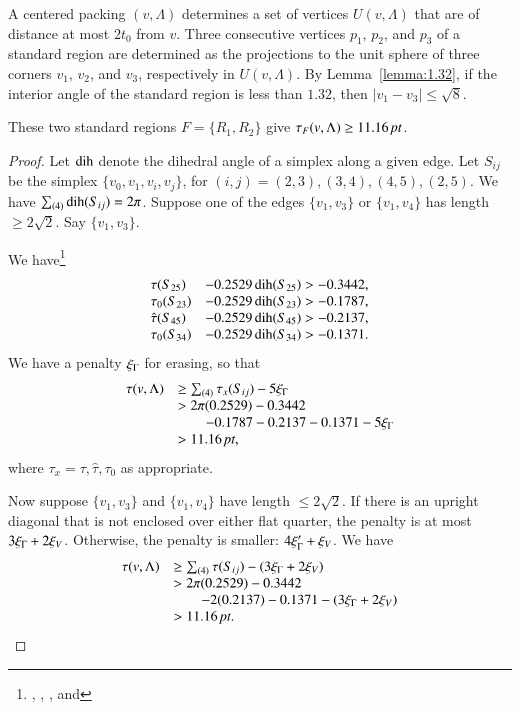 A centered packing $(v,\Lambda)$ determines a set of vertices $U(v,\Lambda)$ that
are of distance at most $2t_0$ from $v$.  Three
consecutive vertices $p_1$, $p_2$, and $p_3$ of a standard region
are determined as the projections to the unit sphere of three
corners $v_1$, $v_2$, and $v_3$, respectively in $U(v,\Lambda)$. By
Lemma~\ref{lemma:1.32}, if the interior angle of the standard
region is less than $1.32$, then $|v_1-v_3|\le\sqrt{8}$.

\begin{lemma} \label{lemma:11.16}
These two standard regions $F=\{R_1,R_2\}$ give
    $\tau_F(v,\Lambda) \ge 11.16\,\hbox{\it pt}$.
\end{lemma}

\begin{proof}
Let $\operatorname{dih}$ denote the dihedral angle of a simplex along a given
edge. Let $S_{ij}$ be the simplex $\{v_0,v_1,v_i,v_j\}$, for
$(i,j)=(2,3),(3,4), (4,5),(2,5)$. We have $\sum_{(4)}\operatorname{dih}(S_{ij})
= 2\pi$. Suppose one of the edges $\{v_1,v_3\}$ or $\{v_1,v_4\}$ has
length $\ge2\sqrt2$. Say $\{v_1,v_3\}$.

We have\footnote{, ,
, and }
    $$
    \begin{array}{lll}
    \tau(S_{25}) &- 0.2529\operatorname{dih}(S_{25}) > -0.3442,\\
    \tau_0(S_{23}) &- 0.2529\operatorname{dih}(S_{23}) > -0.1787,\\
    \hat\tau(S_{45}) &- 0.2529\operatorname{dih}(S_{45}) > -0.2137,\\
    \tau_0(S_{34}) &- 0.2529\operatorname{dih}(S_{34}) > -0.1371.\\
    \end{array}
    $$
We have a penalty $\xi_\Gamma$ for erasing, so that
    $$
    \begin{array}{lll}
        \tau(v,\Lambda) &\ge \sum_{(4)}\tau_x(S_{ij}) - 5\xi_\Gamma\\
                &>2\pi(0.2529)-0.3442\\
                &\qquad -0.1787-0.2137-0.1371-5\xi_\Gamma\\
                &>11.16\,\hbox{\it pt},
    \end{array}
    $$
where $\tau_x=\tau,\hat\tau,\tau_0$ as appropriate.

Now suppose $\{v_1,v_3\}$ and $\{v_1,v_4\}$ have length $\le2\sqrt2$.
If there is an upright diagonal that is not enclosed over either
flat quarter, the penalty is at most $3\xi_\Gamma+2\xi_V$. Otherwise, the
penalty is smaller: $4\xi_\Gamma'+\xi_V$. We have
    $$
    \begin{array}{lll}
    \tau(v,\Lambda)
    &\ge \sum_{(4)}\tau(S_{ij})-(3\xi_\Gamma+2\xi_V)\\
    &>2\pi(0.2529)-0.3442\\
    &\qquad -2(0.2137)-0.1371 -(3\xi_\Gamma+2\xi_V)\\
    &>11.16\,\hbox{\it pt}.\\
    \end{array}
    $$
\end{proof}



